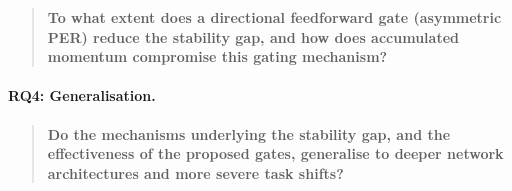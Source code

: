 \begin{quote}
    \textbf{To what extent does a directional feedforward gate (asymmetric PER) reduce the stability gap, and how does accumulated momentum compromise this gating mechanism?}
\end{quote}

\paragraph{RQ4: Generalisation.}

\begin{quote}
    \textbf{Do the mechanisms underlying the stability gap, and the effectiveness of the proposed gates, generalise to deeper network architectures and more severe task shifts?}
\end{quote}